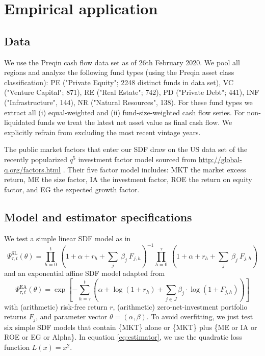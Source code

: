 \documentclass[12pt]{article}
\begin{document}
\section{Empirical application}
\label{sec:empirical_application}

\subsection{Data}

We use the Preqin cash flow data set as of 26th February 2020.
We pool all regions and analyze the following fund types (using the Preqin asset class classification):
PE ("Private Equity"; 2248 distinct funds in data set),
VC ("Venture Capital"; 871),
RE ("Real Estate"; 742),
PD ("Private Debt"; 441),
INF ("Infrastructure", 144), 
NR ("Natural Resources", 138).
For these fund types we extract all (i) equal-weighted and (ii) fund-size-weighted cash flow series.
For non-liquidated funds we treat the latest net asset value as final cash flow.
We explicitly refrain from excluding the most recent vintage years.

The public market factors that enter our SDF draw on the US data set of the recently popularized $q^5$ investment factor model sourced from \url{http://global-q.org/factors.html} \citep{HXZ15,HXZ20}. 
Their five factor model includes: MKT the market excess return, ME the size factor, IA the investment factor, ROE the return on equity factor, and EG the expected growth factor.


\subsection{Model and estimator specifications}
\label{sec:model_selection}
We test a simple linear SDF model as in \cite{DLP12}
\begin{equation}
\label{eq:linear_sdf}
\Psi_{\tau,t}^{\mathrm{SL}} (\theta) = 
\prod_{h=0}^{t}\ \left(1 + \alpha + r_{h} + \sum_j\ \beta_j\ F_{j,h} \right)^{-1}
\prod_{h=0}^{\tau}\ \left(1 + \alpha + r_{h} + \sum_j\ \beta_j \ F_{j,h} \right)
\end{equation}
and an exponential affine SDF model adapted from \cite{KN16}
\begin{equation}
\label{eq:expaff_SDF}
\Psi_{\tau,t}^{\mathrm{EA}} (\theta) = 
\exp
\left[
-
\sum_{h=\tau}^{t} \left( \alpha + \log (1 + r_h) + \sum_{j \in J} \beta_{j} \cdot \log (1 + F_{j,h}) \right)
\right]
\end{equation}
with (arithmetic) risk-free return $r$, (arithmetic) zero-net-investment portfolio returns $F_j$, and parameter vector $\theta=(\alpha,\beta)$.
To avoid overfitting, we just test six simple SDF models that contain \{MKT\} alone or \{MKT\} plus \{ME or IA or ROE or EG or Alpha\}.
In equation \ref{eq:estimator}, we use the quadratic loss function $L(x)=x^2$.
\end{document}
